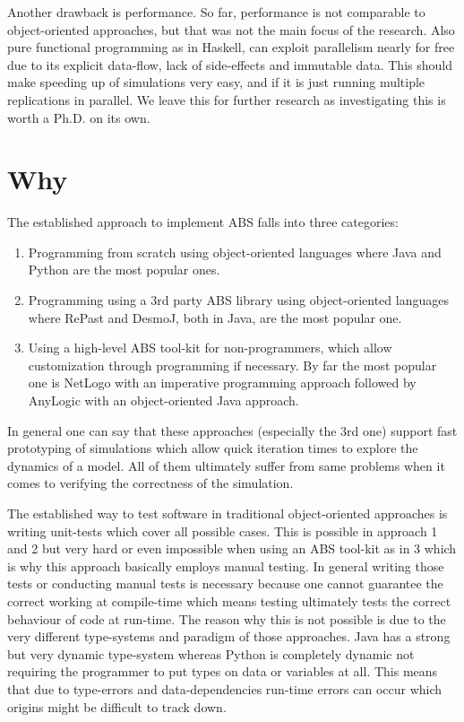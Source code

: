 Another drawback is performance. So far, performance is not comparable to object-oriented approaches, but that was not the main focus of the research. Also pure functional programming as in Haskell, can exploit parallelism nearly for free due to its explicit data-flow, lack of side-effects and immutable data. This should make speeding up of simulations very easy, and if it is just running multiple replications in parallel. We leave this for further research as investigating this is worth a Ph.D. on its own.

\section{Why}
\label{sect:why}
The established approach to implement ABS falls into three categories:
\begin{enumerate}
	\item Programming from scratch using object-oriented languages where Java and Python are the most popular ones.
	\item Programming using a 3rd party ABS library using object-oriented languages where RePast and DesmoJ, both in Java, are the most popular one.
	\item Using a high-level ABS tool-kit for non-programmers, which allow customization through programming if necessary. By far the most popular one is NetLogo with an imperative programming approach followed by AnyLogic with an object-oriented Java approach.
\end{enumerate}

In general one can say that these approaches (especially the 3rd one) support fast prototyping of simulations which allow quick iteration times to explore the dynamics of a model. All of them ultimately suffer from same problems when it comes to verifying the correctness of the simulation.

The established way to test software in traditional object-oriented approaches is writing unit-tests which cover all possible cases. This is possible in approach 1 and 2 but very hard or even impossible when using an ABS tool-kit as in 3 which is why this approach basically employs manual testing. In general writing those tests or conducting manual tests is necessary because one cannot guarantee the correct working at compile-time which means testing ultimately tests the correct behaviour of code at run-time. The reason why this is not possible is due to the very different type-systems and paradigm of those approaches. Java has a strong but very dynamic type-system whereas Python is completely dynamic not requiring the programmer to put types on data or variables at all. This means that due to type-errors and data-dependencies run-time errors can occur which origins might be difficult to track down.

